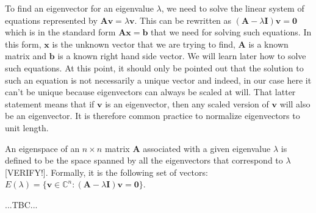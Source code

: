 \medskip
To find an eigenvector for an eigenvalue $\lambda$, we need to solve the linear system of equations represented by $\mathbf{A v} = \lambda \mathbf{v}$.  This can be rewritten as $(\mathbf{A} - \lambda \mathbf{I}) \mathbf{v} = \mathbf{0}$ which is in the standard form $\mathbf{A x} = \mathbf{b}$ that we need for solving such equations. In this form, $\mathbf{x}$ is the unknown vector that we are trying to find, $\mathbf{A}$ is a known matrix and $\mathbf{b}$ is a known right hand side vector. We will learn later how to solve such equations. At this point, it should only be pointed out that the solution to such an equation is not necessarily a unique vector and indeed, in our case here it can't be unique because eigenvectors can always be scaled at will. That latter statement means that if $\mathbf{v}$ is an eigenvector, then any scaled version of $\mathbf{v}$ will also be an eigenvector. It is therefore common practice to normalize eigenvectors to unit length.

\medskip
An eigenspace of an $n \times n$ matrix $\mathbf{A}$ associated with a given eigenvalue $\lambda$ is defined to be the space spanned by all the eigenvectors that correspond to $\lambda$ [VERIFY!]. Formally, it is the following set of vectors: $E(\lambda) = \{\mathbf{v} \in \mathbb{C}^n : (\mathbf{A} - \lambda \mathbf{I}) \mathbf{v} = \mathbf{0}\}$. 



%



...TBC...



